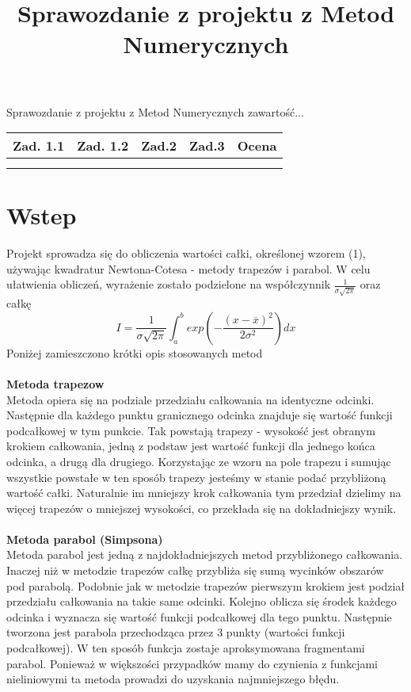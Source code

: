 \documentclass{article}
\title{Sprawozdanie z projektu z Metod Numerycznych}
\begin{document}
		\maketitle	
	\pagestyle{fancy}

	
	Sprawozdanie z projektu z Metod Numerycznych
	zawartość...\\
	\begin{center}
		
		\begin{tabular}{|c|c|c|c|c|}
			\hline
			Zad. 1.1 & Zad. 1.2 &  Zad.2 & Zad.3 & Ocena\\\hline
			 & & & & \\
			 & & & & \\\hline
		\end{tabular}

	\end{center}
	\section{Wstep}
	Projekt sprowadza się do obliczenia wartości całki, określonej wzorem (1), używając kwadratur Newtona-Cotesa - metody trapezów i parabol. W celu ułatwienia obliczeń, wyrażenie zostało podzielone na współczynnik $\frac{1}{\sigma\sqrt{2\pi}}$ oraz całkę
		\begin{equation}
			I = \frac{1}{\sigma\sqrt{2\pi}}  \int_{a}^{b} exp  \left( - \frac{(x-\overline{x})^2}{2\sigma^2}   \right) dx
		\end{equation}
		Poniżej zamieszczono krótki opis stosowanych metod
		\\\\
		\textbf {Metoda trapezow }
		\\ 
		Metoda opiera się na podziale przedziału całkowania na identyczne odcinki. Następnie dla każdego punktu granicznego odcinka znajduje się wartość funkcji podcałkowej w tym punkcie. Tak powstają trapezy - wysokość jest obranym krokiem całkowania, jedną z podstaw jest wartość funkcji dla jednego końca odcinka, a drugą dla drugiego. Korzystając ze wzoru na pole trapezu i sumując wszystkie powstałe w ten sposób trapezy jesteśmy w stanie podać przybliżoną wartość całki. Naturalnie im mniejszy krok całkowania tym przedział dzielimy na więcej trapezów o mniejszej wysokości, co przekłada się na dokładniejszy wynik. 
		\\\\
		\textbf {Metoda parabol (Simpsona)}
		\\ 
		Metoda parabol jest jedną z najdokładniejszych metod przybliżonego całkowania. Inaczej niż w metodzie trapezów całkę przybliża się sumą wycinków obszarów pod parabolą. Podobnie jak w metodzie trapezów pierwszym krokiem jest podział przedziału całkowania na takie same odcinki. Kolejno oblicza się środek każdego odcinka i wyznacza się wartość funkcji podcałkowej dla tego punktu. Następnie tworzona jest parabola przechodząca przez 3 punkty (wartości funkcji podcałkowej). W ten sposób funkcja zostaje aproksymowana fragmentami parabol. Ponieważ w większości przypadków mamy do czynienia z funkcjami nieliniowymi ta metoda prowadzi do uzyskania najmniejszego błędu.  
		
\end{document}
